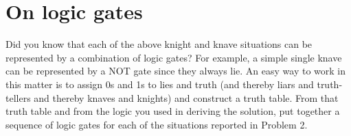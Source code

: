\documentclass[11pt]{book}
\begin{document}
\newpage

\section{On logic gates}
Did you know that each of the above knight and knave situations can be represented by a combination of logic gates? For example, a simple single knave can be represented by a NOT gate since they always lie. An easy way to work in this matter is to assign 0s and 1s to lies and truth (and thereby liars and truth-tellers and thereby knaves and knights) and construct a truth table. From that truth table and from the logic you used in deriving the solution, put together a sequence of logic gates for each of the situations reported in Problem 2.
\end{document}
